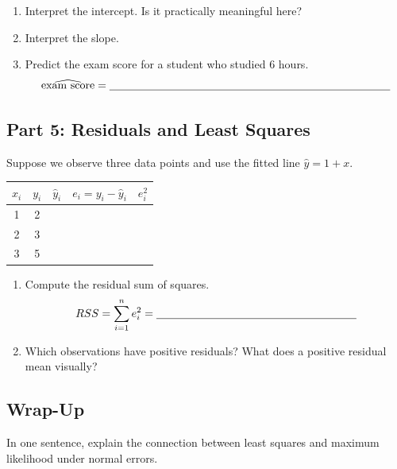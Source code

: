 \documentclass{article}
\newcommand{\blankline}[1]{\underline{\hspace{#1}}}
\begin{document}
\begin{enumerate}[label={\bfseries (\Alph*)},itemsep=.75em]
\item Interpret the intercept. Is it practically meaningful here? \\[3.5em]
\item Interpret the slope. \\[3em]
\item Predict the exam score for a student who studied 6 hours.
\[
\widehat{\text{exam score}} = \blankline{3.5in}
\]
\end{enumerate}

\subsection*{Part 5: Residuals and Least Squares}
Suppose we observe three data points and use the fitted line $\hat y = 1+x$.

\begin{center}
\renewcommand{\arraystretch}{1.55}
\begin{tabular}{ccccc}
\toprule
$x_i$ & $y_i$ & $\hat y_i$ & $e_i = y_i - \hat y_i$ & $e_i^2$ \\
\midrule
1 & 2 & & & \\[1.7em]
2 & 3 & & & \\[1.7em]
3 & 5 & & & \\
\bottomrule
\end{tabular}
\end{center}

\begin{enumerate}[label={\bfseries (\Alph*)},itemsep=.75em]
\item Compute the residual sum of squares.
\[
RSS = \sum_{i=1}^n e_i^2 = \blankline{2.5in}
\]
\item Which observations have positive residuals? What does a positive residual mean visually? \\[3em]
\end{enumerate}

\subsection*{Wrap-Up}
In one sentence, explain the connection between least squares and maximum likelihood under normal errors. \\[4em]
\end{document}
